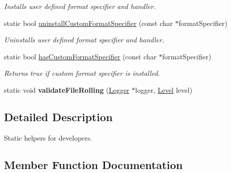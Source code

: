 \begin{DoxyCompactItemize}
\begin{DoxyCompactList}\small\item\em Installs user defined format specifier and handler. \end{DoxyCompactList}\item 
static bool \hyperlink{classel_1_1Helpers_a23ec73819c25758d604d149ad0c6b73f}{uninstall\+Custom\+Format\+Specifier} (const char $\ast$format\+Specifier)\hypertarget{classel_1_1Helpers_a23ec73819c25758d604d149ad0c6b73f}{}\label{classel_1_1Helpers_a23ec73819c25758d604d149ad0c6b73f}

\begin{DoxyCompactList}\small\item\em Uninstalls user defined format specifier and handler. \end{DoxyCompactList}\item 
static bool \hyperlink{classel_1_1Helpers_a154ce041890564d1ae5f87184e24f13d}{has\+Custom\+Format\+Specifier} (const char $\ast$format\+Specifier)\hypertarget{classel_1_1Helpers_a154ce041890564d1ae5f87184e24f13d}{}\label{classel_1_1Helpers_a154ce041890564d1ae5f87184e24f13d}

\begin{DoxyCompactList}\small\item\em Returns true if custom format specifier is installed. \end{DoxyCompactList}\item 
static void {\bfseries validate\+File\+Rolling} (\hyperlink{classel_1_1Logger}{Logger} $\ast$logger, \hyperlink{namespaceel_ab0ac6091262344c52dd2d3ad099e8e36}{Level} level)\hypertarget{classel_1_1Helpers_aea3fcde8a07e6f7278574e9563d8ab6b}{}\label{classel_1_1Helpers_aea3fcde8a07e6f7278574e9563d8ab6b}

\end{DoxyCompactItemize}


\subsection{Detailed Description}
Static helpers for developers. 

\subsection{Member Function Documentation}
